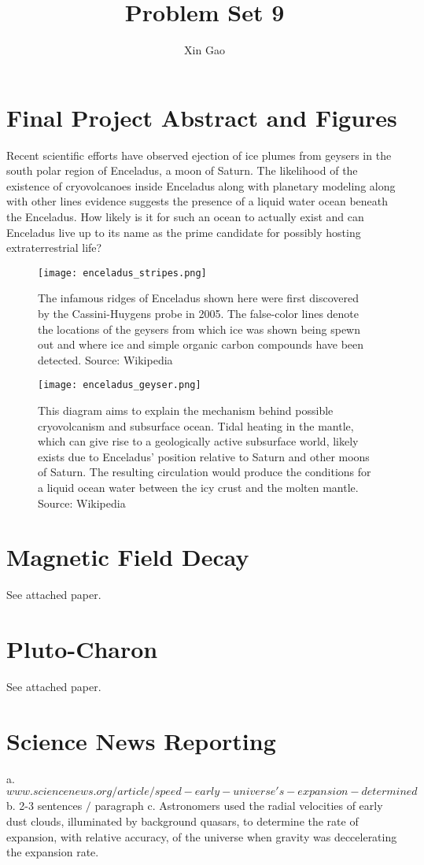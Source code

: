 \documentclass{article}
\begin{document}
\title{Problem Set 9}
\author{Xin Gao}
\date{}
\maketitle

\section{Final Project Abstract and Figures}
Recent scientific efforts have observed ejection of ice plumes from
geysers in the south polar region of Enceladus, a moon of Saturn. The
likelihood of the existence of cryovolcanoes inside Enceladus along with
planetary modeling along with other lines evidence suggests the presence
of a liquid water ocean beneath the Enceladus. How likely is it for such
an ocean to actually exist and can Enceladus live up to its name as the
prime candidate for possibly hosting extraterrestrial life?

\begin{figure}[H]
\centering
\texttt{[image: enceladus\_stripes.png]}
\caption{The infamous ridges of Enceladus shown here were first
  discovered by the Cassini-Huygens probe in 2005. The false-color lines
  denote the locations of the geysers from which ice was shown being
  spewn out and where ice and simple organic carbon compounds have been
  detected. Source: Wikipedia}
\end{figure}
\begin{figure}[H]
\centering
\texttt{[image: enceladus\_geyser.png]}
\caption{This diagram aims to explain the mechanism behind possible
  cryovolcanism and subsurface ocean. Tidal heating in the mantle, which
  can give rise to a geologically active subsurface world, likely exists
  due to Enceladus' position relative to Saturn and other moons of
  Saturn. The resulting circulation would produce the conditions for a
  liquid ocean water between the icy crust and the molten
  mantle. Source: Wikipedia} 
\end{figure}
\section{Magnetic Field Decay}
See attached paper.
\section{Pluto-Charon}
See attached paper.
\section{Science News Reporting}
a. $www.sciencenews.org/article/speed-early-universe's-expansion-determined$
b. 2-3 sentences $/$ paragraph
c. Astronomers used the radial velocities of early dust clouds,
illuminated by background quasars, to determine the rate of expansion,
with relative accuracy, of the universe when gravity was deccelerating
the expansion rate.  
\end{document}
